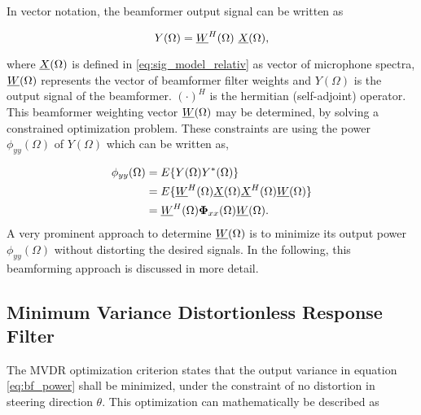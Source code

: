 \pagebreak

In vector notation, the beamformer output signal can be written as

\begin{equation}
Y(\Omega) = \underline{W}^H(\Omega)\ \underline{X} (\Omega),
\label{eq:filter_sum}
\end{equation}

where $\underline{X}(\Omega)$ is defined in \ref{eq:sig_model_relativ} as vector of microphone spectra, $\underline{W}(\Omega)$ represents the vector of beamformer filter weights and $Y(\Omega)$ is the output signal of the beamformer. $(\cdot)^H$ is the hermitian (self-adjoint) operator. This beamformer weighting vector $\underline{W}(\Omega)$ may be determined, by solving a constrained optimization problem. These constraints are using the power $\phi_{yy}(\Omega)$ of $Y(\Omega)$ which can be written as,

\begin{equation}
\begin{split}
\phi_{yy}(\Omega) &= E\{Y(\Omega)Y^*(\Omega)\} \\
&= E\{\underline{W}^H(\Omega) \underline{X}(\Omega) \underline{X}^H(\Omega) \underline{W}(\Omega)\}\\
&= \underline{W}^H(\Omega) \mathbf{\Phi}_{xx}(\Omega)\underline{W}(\Omega).
\label{eq:bf_power}
\end{split}
\end{equation}
A very prominent approach to determine $\underline{W}(\Omega)$ is to minimize its output power $\phi_{yy}(\Omega)$ without distorting the desired signals. In the following, this beamforming approach is discussed in more detail.





\subsection{Minimum Variance Distortionless Response Filter}
\label{subsec:mvdr}
The \ac{MVDR} optimization criterion states that the output variance in equation \ref{eq:bf_power} shall be minimized, under the constraint of no distortion in steering direction $\theta$. This optimization can mathematically be described as

